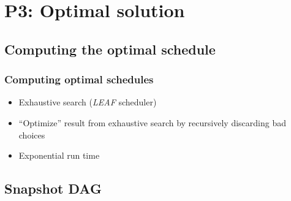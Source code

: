 \documentclass{beamer}
\begin{document}
\section{P3: Optimal solution}

\subsection{Computing the optimal schedule}

\begin{frame}
  \frametitle{Computing optimal schedules}
  \begin{itemize}
  \item Exhaustive search (\emph{LEAF} scheduler)
  \item ``Optimize'' result from exhaustive search by recursively discarding bad choices
  \item Exponential run time
  \end{itemize}
\end{frame}

\subsection{Snapshot DAG}
\end{document}
